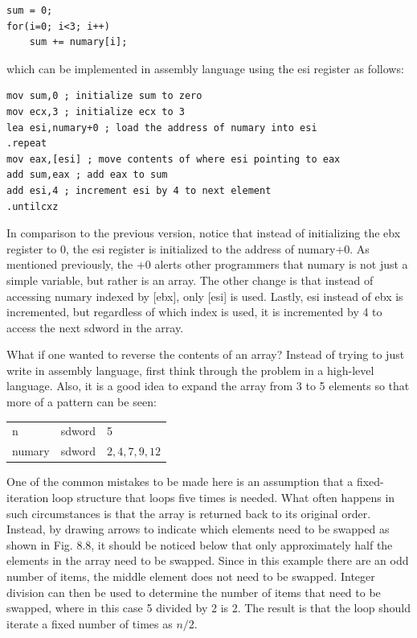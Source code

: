 \documentclass[10pt]{book}
\begin{document}
\begin{verbatim}
sum = 0;
for(i=0; i<3; i++)
    sum += numary[i];
\end{verbatim}

which can be implemented in assembly language using the esi register as follows:

\begin{verbatim}
mov sum,0 ; initialize sum to zero
mov ecx,3 ; initialize ecx to 3
lea esi,numary+0 ; load the address of numary into esi
.repeat
mov eax,[esi] ; move contents of where esi pointing to eax
add sum,eax ; add eax to sum
add esi,4 ; increment esi by 4 to next element
.untilcxz
\end{verbatim}

In comparison to the previous version, notice that instead of initializing the ebx register to 0, the esi register is initialized to the address of numary+0. As mentioned previously, the +0 alerts other programmers that numary is not just a simple variable, but rather is an array. The other change is that instead of accessing numary indexed by [ebx], only [esi] is used. Lastly, esi instead of ebx is incremented, but regardless of which index is used, it is incremented by 4 to access the next sdword in the array.

What if one wanted to reverse the contents of an array? Instead of trying to just write in assembly language, first think through the problem in a high-level language. Also, it is a good idea to expand the array from 3 to 5 elements so that more of a pattern can be seen:

\begin{center}
\begin{tabular}{lll}
n & sdword & 5 \\
numary & sdword & $2,4,7,9,12$ \\
\end{tabular}
\end{center}

One of the common mistakes to be made here is an assumption that a fixed-iteration loop structure that loops five times is needed. What often happens in such circumstances is that the array is returned back to its original order. Instead, by drawing arrows to indicate which elements need to be swapped as shown in Fig. 8.8, it should be noticed below that only approximately half the elements in the array need to be swapped. Since in this example there are an odd number of items, the middle element does not need to be swapped. Integer division can then be used to determine the number of items that need to be swapped, where in this case 5 divided by 2 is 2. The result is that the loop should iterate a fixed number of times as $n/2$.
\end{document}
